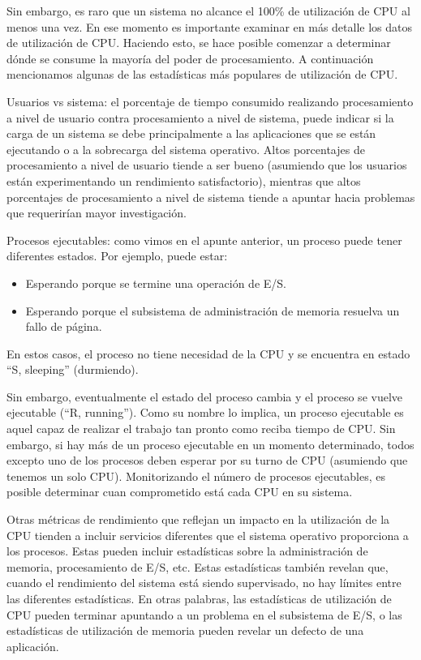 \documentclass[12pt]{article}
\begin{document}
Sin embargo, es raro que un sistema no alcance el 100\% de utilización de 
CPU al menos una vez. En ese momento es importante examinar en más detalle 
los datos de utilización de CPU. Haciendo esto, se hace posible comenzar a 
determinar dónde se consume la mayoría del poder de procesamiento. A 
continuación mencionamos algunas de las estadísticas más populares de 
utilización de CPU.

Usuarios vs sistema: el porcentaje de tiempo consumido realizando 
procesamiento a nivel de usuario contra procesamiento a nivel de sistema, 
puede indicar si la carga de un sistema se debe principalmente a las 
aplicaciones que se están ejecutando o a la sobrecarga del sistema 
operativo. Altos porcentajes de procesamiento a nivel de usuario tiende a 
ser bueno (asumiendo que los usuarios están experimentando un rendimiento
satisfactorio), mientras que altos porcentajes de procesamiento a nivel de 
sistema tiende a apuntar hacia problemas que requerirían mayor 
investigación.

Procesos ejecutables: como vimos en el apunte anterior, un proceso puede 
tener diferentes estados. Por ejemplo, puede estar:
\begin{itemize}
\item Esperando porque se termine una operación de E/S.
\item Esperando porque el subsistema de administración de memoria 
resuelva un fallo de página.
\end{itemize}
En estos casos, el proceso no tiene necesidad de la CPU y se encuentra en
estado ``S, sleeping'' (durmiendo).  

Sin embargo, eventualmente el estado del proceso cambia y el proceso se 
vuelve ejecutable (``R, running''). Como su nombre lo implica, un proceso 
ejecutable es aquel capaz de realizar el trabajo tan pronto como reciba 
tiempo de CPU. Sin embargo, si hay más de un proceso ejecutable en un 
momento determinado, todos excepto uno de los procesos deben esperar por su 
turno de CPU (asumiendo que tenemos un solo CPU). Monitorizando el
número de procesos ejecutables, es posible determinar cuan comprometido 
está cada CPU en su sistema.

Otras métricas de rendimiento que reflejan un impacto en la utilización 
de la CPU tienden a incluir servicios diferentes que el sistema operativo 
proporciona a los procesos. Estas pueden incluir estadísticas sobre la 
administración de memoria, procesamiento de E/S, etc. Estas estadísticas 
también revelan que, cuando el rendimiento del sistema está siendo 
supervisado, no hay límites entre las diferentes estadísticas. En otras 
palabras, las estadísticas de utilización de CPU pueden terminar apuntando 
a un problema en el subsistema de E/S, o las estadísticas de utilización 
de memoria pueden revelar un defecto de una aplicación.
\end{document}
